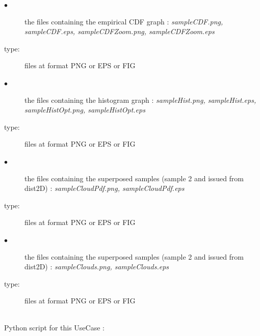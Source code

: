 {
  \begin{description}
  \item[$\bullet$] the files containing the empirical CDF graph : {\itshape sampleCDF.png, sampleCDF.eps, sampleCDFZoom.png, sampleCDFZoom.eps}
  \item[type:]  files at format PNG or EPS or FIG
  \item[$\bullet$] the files containing the histogram graph : {\itshape sampleHist.png, sampleHist.eps, sampleHistOpt.png, sampleHistOpt.eps}
  \item[type:]  files at format PNG or EPS or FIG
  \item[$\bullet$] the files containing the superposed samples (sample 2 and issued from dist2D)  : {\itshape sampleCloudPdf.png, sampleCloudPdf.eps}
  \item[type:]  files at format PNG or EPS or FIG
  \item[$\bullet$] the files containing the superposed samples (sample 2 and issued from dist2D)  : {\itshape sampleClouds.png, sampleClouds.eps}
  \item[type:]  files at format PNG or EPS or FIG
  \end{description}
}

\textspace\\
Python script for this UseCase :


